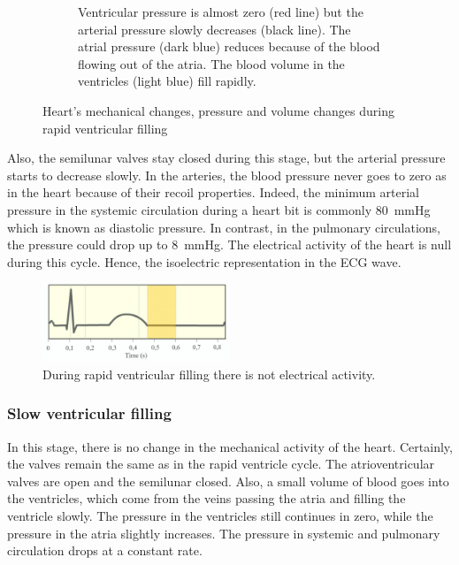 \begin{figure}[!htpb]
\begin{subfigure}[t]{0.48\textwidth}
		\caption{Ventricular pressure is almost zero (red line) but the arterial pressure slowly decreases (black line). The atrial pressure (dark blue) reduces because of the blood flowing out of the atria. The blood volume in the ventricles (light blue) fill rapidly.}
		\label{fig:pressure rapid ventricular fillig}
	\end{subfigure}
	\caption[Rapid ventricular filling]{{Heart's mechanical changes, pressure and volume changes during rapid ventricular filling}}
\end{figure}

Also, the semilunar valves stay closed during this stage, but the arterial pressure starts to decrease slowly. In the arteries, the blood pressure never goes to zero as in the heart because of their recoil properties. Indeed, the minimum arterial pressure in the systemic circulation during a heart bit is commonly \SI{80}{\mmHg} which is known as diastolic pressure. In contrast, in the pulmonary circulations, the pressure could drop up to \SI{8}{\mmHg}. The electrical activity of the heart is null during this cycle. Hence, the isoelectric representation in the ECG wave.

\begin{figure}[!htpb]
	\centering
	\includegraphics[width=0.5\textwidth,keepaspectratio]{figure_14} 
	\caption[ECG during rapid ventricular filling]{During rapid ventricular filling there is not electrical activity.}
	\label{fig:ECG rapid ventricular filling}
\end{figure}

\subsubsection{Slow ventricular filling}
In this stage, there is no change in the mechanical activity of the heart. Certainly, the valves remain the same as in the rapid ventricle cycle. The atrioventricular valves are open and the semilunar closed. Also, a small volume of blood goes into the ventricles, which come from the veins passing the atria and filling the ventricle slowly. The pressure in the ventricles still continues in zero, while the pressure in the atria slightly increases. The pressure in systemic and pulmonary circulation drops at a constant rate. 

